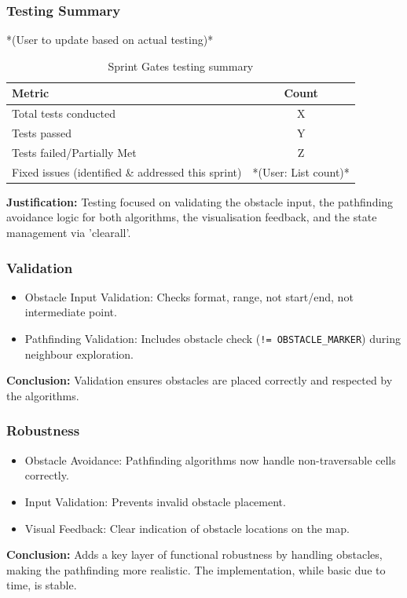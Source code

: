 \newpage

\subsubsection{Testing Summary}
*(User to update based on actual testing)*
\begin{table}[htbp]
	\centering
	\begin{tabular}{|l|c|}
		\hline
		\textbf{Metric} & \textbf{Count} \\
		\hline
		Total tests conducted & X \\ %
		\hline
		Tests passed & Y \\
		\hline
		Tests failed/Partially Met & Z \\
		\hline
		Fixed issues (identified \& addressed this sprint) & *(User: List count)* \\
		\hline
	\end{tabular}
	\caption{Sprint Gates testing summary}
\end{table}
\textbf{Justification:} Testing focused on validating the obstacle input, the pathfinding avoidance logic for both algorithms, the visualisation feedback, and the state management via 'clearall'.

\subsubsection{Validation}
\begin{itemize}
	\item Obstacle Input Validation: Checks format, range, not start/end, not intermediate point.
	\item Pathfinding Validation: Includes obstacle check (\verb|!= OBSTACLE_MARKER|) during neighbour exploration.
\end{itemize}
\textbf{Conclusion:} Validation ensures obstacles are placed correctly and respected by the algorithms.

\subsubsection{Robustness}
\begin{itemize}
	\item Obstacle Avoidance: Pathfinding algorithms now handle non-traversable cells correctly.
	\item Input Validation: Prevents invalid obstacle placement.
	\item Visual Feedback: Clear indication of obstacle locations on the map.
\end{itemize}
\textbf{Conclusion:} Adds a key layer of functional robustness by handling obstacles, making the pathfinding more realistic. The implementation, while basic due to time, is stable.

